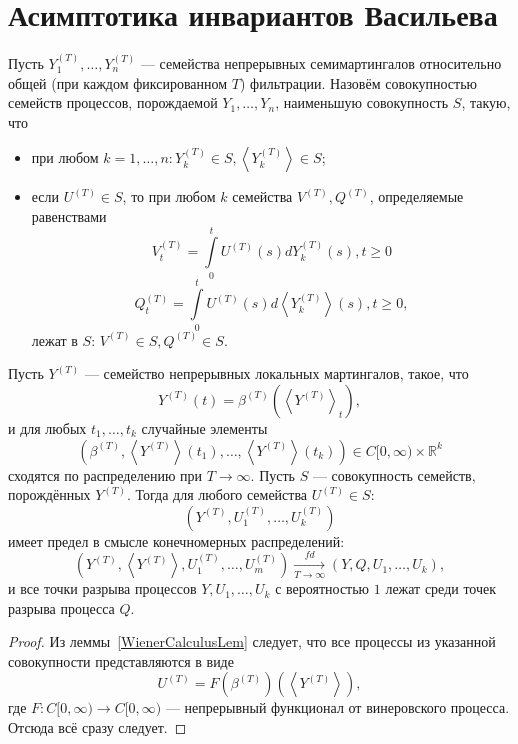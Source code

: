 \documentclass[12pt, a4paper, titlepage]{article}
\begin{document}
\section{Асимптотика инвариантов Васильева}
\begin{definition}
  Пусть $Y_1^{(T)}, \ldots, Y_n^{(T)}$ --- семейства непрерывных семимартингалов
 относительно общей (при каждом фиксированном $T$) фильтрации. 
Назовём совокупностью семейств процессов, порождаемой $Y_1, \ldots, Y_n$,
наименьшую совокупность $S$, такую, что
\begin{itemize}
 \item при любом $k=1, \ldots, n \colon Y_k^{(T)}\in S, \left<Y_k^{(T)}\right> \in S$;
 \item если $U^{(T)}\in S$, то при любом $k$ семейства $V^{(T)}, Q^{(T)}$, определяемые 
равенствами
$$V^{(T)}_t = \int\limits_0^t U^{(T)}(s)dY_k^{(T)}(s), t \ge 0$$
$$Q^{(T)}_t = \int\limits_0^t U^{(T)}(s)d\left<Y_k^{(T)}\right>(s), t \ge 0,$$
лежат в $S$: $V^{(T)}\in S, Q^{(T)}\in S.$
\end{itemize}
\end{definition}

\begin{theorem}\label{YDefinedProcessesTheorem}
 Пусть $Y^{(T)}$ --- семейство непрерывных локальных мартингалов, такое, что
$$Y^{(T)}(t)=\beta^{(T)}\left(\left<Y^{(T)}\right>_t\right),$$
и для любых $t_1, \ldots, t_k$ случайные элементы
$$(\beta^{(T)}, \left<Y^{(T)}\right>(t_1), \ldots, \left<Y^{(T)}\right>(t_k)) 
\in C[0, \infty)\times \mathbb{R}^k$$
сходятся по распределению при $T \to \infty$. 
Пусть $S$ --- совокупность семейств, порождённых $Y^{(T)}$.
Тогда для любого семейства $U^{(T)}\in S$: 
$$(Y^{(T)}, U_1^{(T)}, \ldots,  U_k^{(T)})$$
имеет предел в смысле конечномерных 
распределений:
$$\left(Y^{(T)}, \left<Y^{(T)}\right>,
U_1^{(T)}, \ldots,  U_m^{(T)}\right) \xrightarrow[T \to \infty]{fd}
\left(Y, Q, U_1, \ldots,  U_k\right),$$
и все точки разрыва процессов $Y, U_1, \ldots, U_k$
с вероятностью $1$ лежат среди точек разрыва процесса $Q$. 
\end{theorem}
\begin{proof}
 Из леммы~\ref{WienerCalculusLem} следует, что все процессы
 из указанной совокупности представляются в виде
$$U^{(T)}=F(\beta^{(T)})(\left<Y^{(T)}\right>),$$
где $F\colon C[0,\infty) \to C[0, \infty)$ --- непрерывный функционал от винеровского процесса. 
Отсюда всё сразу следует. 
\end{proof}
\end{document}
